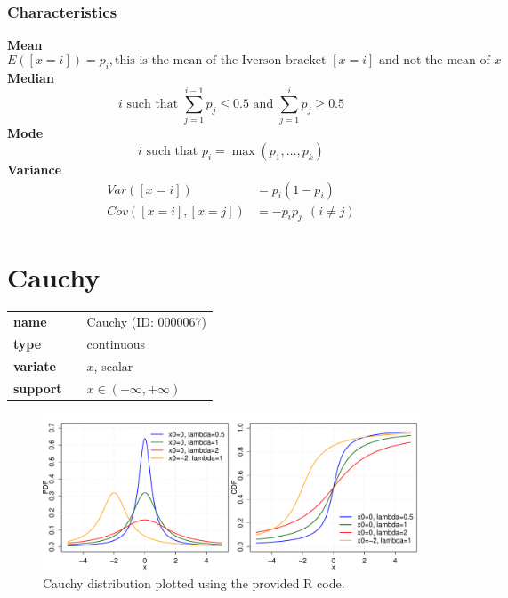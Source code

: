 \subsubsection*{Characteristics}
\smallskip \noindent \hspace{.2cm} \textbf{Mean} 
\begin{equation*}E([x=i]) = p_i, \text{this is the mean of the Iverson bracket } [x=i] \text{ and not the mean of } x\end{equation*}
\smallskip \noindent \hspace{.2cm} \textbf{Median} 
\begin{equation*}i\text{ such that }\sum_{j=1}^{i-1} p_j \leq 0.5\text{ and }\sum_{j=1}^{i} p_j \geq 0.5\end{equation*}
\smallskip \noindent \hspace{.2cm} \textbf{Mode} 
\begin{equation*}i\text{ such that }p_i=\max(p_1, \ldots, p_k)\end{equation*}
\smallskip \noindent \hspace{.2cm} \textbf{Variance} 
\begin{align*}Var([x=i]) &= p_i (1-p_i) \\ Cov([x=i],[x=j]) &= - p_i p_j~~(i\neq j)\end{align*}
\smallskip
\section*{Cauchy} 

  \bigskip 

\begin{tabular}{p{2cm}cl}
\textbf{name} & & Cauchy (ID: 0000067)\\ 
 
\textbf{type} & & continuous \\ 

\textbf{variate} & & $x$, scalar \\ 

\textbf{support} & & $x \in (-\infty,+\infty)$
\end{tabular}

\begin{figure}[ht!]
\centering
  \includegraphics[width=140mm]{pics/Cauchy.pdf}
 \caption{Cauchy distribution plotted using the provided R code.}
 \label{fig:Cauchy}
\end{figure}

